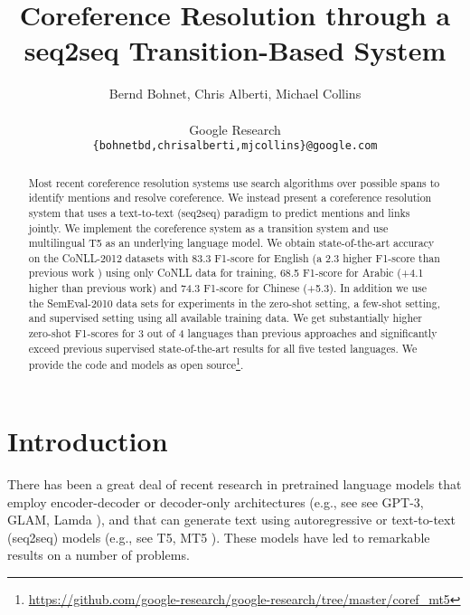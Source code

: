 \documentclass[11pt,a4paper]{article}
\title{Coreference Resolution through a seq2seq Transition-Based System}
\author{
  Bernd Bohnet, Chris Alberti, Michael Collins
  \\ \\
  Google Research
  \\
  \texttt{\{bohnetbd,chrisalberti,mjcollins\}@google.com}
 
}
\date{}
\begin{document}
\maketitle
\begin{abstract}
Most recent coreference resolution systems use search algorithms over possible spans to identify mentions and resolve coreference. We instead present a coreference resolution system that uses a text-to-text (seq2seq) paradigm to predict mentions and links jointly. We implement the coreference system as a transition system and use multilingual T5 as an underlying language model. We obtain state-of-the-art accuracy on the CoNLL-2012 datasets with 83.3 F1-score for English (a 2.3 higher F1-score than previous work \cite{dobrovolskii-2021-word}) using only CoNLL data for training, 68.5 F1-score for Arabic (+4.1 higher than previous work) and 74.3 F1-score for Chinese (+5.3). In addition we use the SemEval-2010 data sets for experiments in the zero-shot setting, a few-shot setting, and supervised setting using all available training data. We get substantially higher zero-shot F1-scores for 3 out of 4 languages than previous approaches and significantly exceed previous supervised state-of-the-art results for all five tested languages. We provide the code and models as open source\footnote{\url{https://github.com/google-research/google-research/tree/master/coref_mt5}}.
\end{abstract}


\section{Introduction}

There has been a great deal of recent research in pretrained language models that employ encoder-decoder or decoder-only architectures (e.g., see see GPT-3, GLAM, Lamda \cite{DBLP:journals/corr/abs-2005-14165, DBLP:journals/corr/abs-2112-06905,DBLP:journals/corr/abs-2201-08239}), and that can generate text using autoregressive or text-to-text (seq2seq) models (e.g., see T5, MT5 \cite{DBLP:journals/corr/abs-1910-10683,xue-etal-2021-mt5}). These models have led to remarkable results on a number of problems. 
\end{document}
